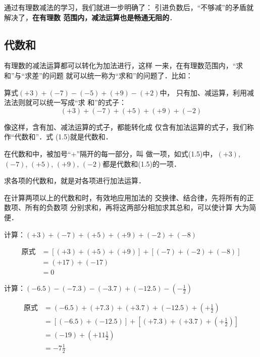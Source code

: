 通过有理数减法的学习，我们就进一步明确了：
引进负数后，“不够减”的矛盾就解决了，\textbf{在有理数
	范围内，减法运算也是畅通无阻的}．


\subsection{代数和}
有理数的减法运算都可以转化为加法进行，这样
一来，在有理数范围内，“求和”与“求差”的问题
就可以统一称为“求和”的问题了．比如：

算式$(+ 3)+(-7)-(-5)+(+9)-(+2)$中，
只有加、减运算，利用减法法则就可以统一写成“求
和”的式子：
\begin{equation}
(+ 3)+(-7)+(+5)+(+9)+(-2)
\end{equation}

像这样，含有加、减法运算的式子，都能转化成
仅含有加法运算的式子，我们称作“代数和”．式
(1.5)就是代数和．

在代数和中，被加号“+”隔开的每一部分，叫
做一项，如式(1.5)中，$(+3)$, $(-7)$, $(+ 5)$,
$(+9)$, $(-2)$都是代数和(1.5)的一项．

求各项的代数和，就是对各项进行加法运算．

在计算两项以上的代数和时，有效地应用加法的
交换律、结合律，先将所有的正数项、所有的负数项
分别求和，再将这两部分相加求其总和，可以使计算
大为简便．

\begin{example}
	计算：$(+3)+(-7)+(+5)+(+9)+(-2)+(-8)$
\end{example}

\begin{solution}
	\begin{align*}
	\text{原式}&= [(+3)+(+5)+(+9)]+[(-7)+(-2)+(-8)] \tag{交换、结合律}\\
	&=(+17)+(-17) \tag{同号加法法则}\\
	&=0 \tag{相反数的特性}
	\end{align*}
\end{solution}

\begin{example}
	计算：$(-6.5)-(-7.3)-(-3.7)+(-12.5)-\left(-\frac{1}{2}\right)$
\end{example}

\begin{solution}
	\begin{align*}
	\text{原式}&= (-6.5)+(+7.3)+(+3.7)+(-12.5)+\left(+\frac{1}{2}\right) \tag{减法法则}\\
	&=[(-6.5)+(-12.5)]+\left[(+7.3)+(+3.7)+\left(+\frac{1}{2}\right)\right] \tag{交换、结合律}\\
	&=(-19)+\left(+11\frac{1}{2}\right) \tag{同号相加法则}\\
	&=-7\frac{1}{2} \tag{异号相加法则}
	\end{align*}
\end{solution}

